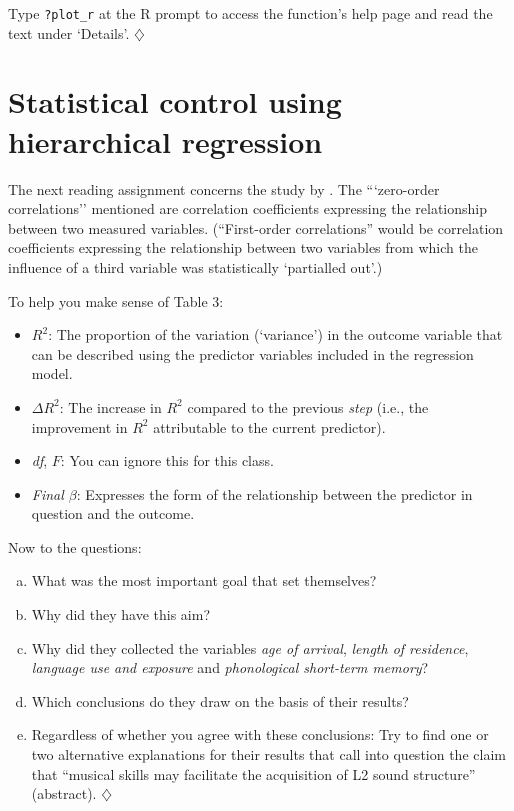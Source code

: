 \documentclass[a4paper]{tufte-book}\usepackage[]{graphicx}\usepackage[]{xcolor}
\newcommand*{\parend}[1][$\diamondsuit$]{%
  \unskip\nobreak\hspace{1em plus 1fill}$\diamondsuit$%
}
\begin{document}
Type \texttt{?plot\_r} at the R prompt to access the function's
help page and read the text under `Details'.\parend

\section{Statistical control using hierarchical regression}
The next reading assignment concerns the study by \citet{Slevc2006}.
The ```zero-order correlations'' mentioned
are correlation coefficients expressing the relationship between two measured variables.
(``First-order correlations'' would be correlation coefficients expressing the relationship between two variables from which the influence of a third variable was statistically `partialled out'.)

To help you make sense of Table 3:
\begin{itemize}
 \item $R^2$: The proportion of the variation (`variance') in the outcome variable that can be described using the predictor
 variables included in the regression model.

 \item $\Delta R^2$: The increase in $R^2$ compared to the previous \textit{step} (i.e., the improvement in $R^2$ attributable to the current predictor).

 \item \textit{df}, $F$: You can ignore this for this class.

 \item \textit{Final $\beta$}: Expresses the form of the relationship between the predictor in question and the outcome.
\end{itemize}

\medskip

Now to the questions:
\begin{enumerate}[(a)]
  \item What was the most important goal that \citet{Slevc2006} set themselves?

  \item Why did they have this aim?

  \item Why did they collected the variables \textit{age of arrival},
  \textit{length of residence}, \textit{language use and exposure}
  and \textit{phonological short-term memory}?

  \item Which conclusions do they draw on the basis of their results?

  \item Regardless of whether you agree with these conclusions: Try
  to find one or two alternative explanations for their results
  that call into question the claim that ``musical skills may
  facilitate the acquisition of L2 sound structure'' (abstract).\parend
\end{enumerate}
\end{document}
